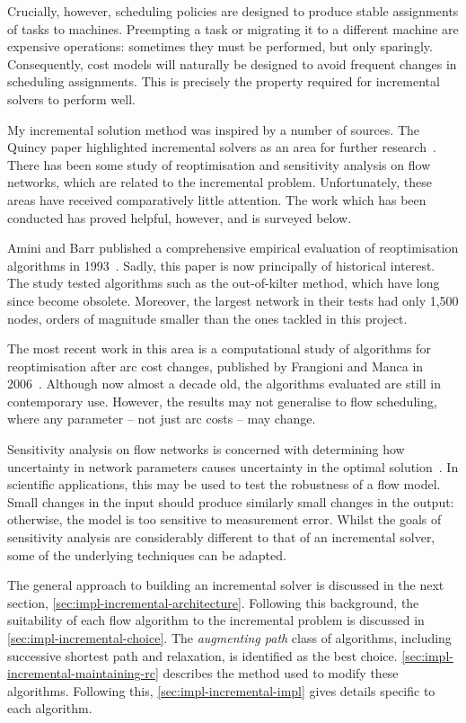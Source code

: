 Crucially, however, scheduling policies are designed to produce stable assignments of tasks to machines. Preempting a task or migrating it to a different machine are expensive operations: sometimes they must be performed, but only sparingly. Consequently, cost models will naturally be designed to avoid frequent changes in scheduling assignments. This is precisely the property required for incremental solvers to perform well.

My incremental solution method was inspired by a number of sources. The Quincy paper highlighted incremental solvers as an area for further research~\cite[\S6.5]{Isard:2007}. There has been some study of reoptimisation and sensitivity analysis on flow networks, which are related to the incremental problem. Unfortunately, these areas have received comparatively little attention. The work which has been conducted has proved helpful, however, and is surveyed below.

Amini and Barr published a comprehensive empirical evaluation of reoptimisation algorithms in 1993~\cite{Amini:1993}. Sadly, this paper is now principally of historical interest. The study tested algorithms such as the out-of-kilter method, which have long since become obsolete. Moreover, the largest network in their tests had only 1,500 nodes, orders of magnitude smaller than the ones tackled in this project. 

The most recent work in this area is a computational study of algorithms for reoptimisation after arc cost changes, published by Frangioni and Manca in 2006~\cite{Frangioni:2006}. Although now almost a decade old, the algorithms evaluated are still in contemporary use. However, the results may not generalise to flow scheduling, where any parameter -- not just arc costs -- may change. 

Sensitivity analysis on flow networks is concerned with determining how uncertainty in network parameters causes uncertainty in the optimal solution~\cite[\S9.11]{Ahuja:1993}. In scientific applications, this may be used to test the robustness of a flow model. Small changes in the input should produce similarly small changes in the output: otherwise, the model is too sensitive to measurement error. Whilst the goals of sensitivity analysis are considerably different to that of an incremental solver, some of the underlying techniques can be adapted.

The general approach to building an incremental solver is discussed in the next section, \cref{sec:impl-incremental-architecture}. Following this background, the suitability of each flow algorithm to the incremental problem is discussed in \cref{sec:impl-incremental-choice}. The \emph{augmenting path} class of algorithms, including successive shortest path and relaxation, is identified as the best choice. \cref{sec:impl-incremental-maintaining-rc} describes the method used to modify these algorithms. Following this, \cref{sec:impl-incremental-impl} gives details specific to each algorithm.

